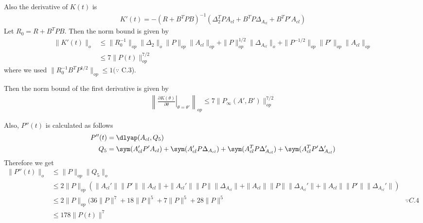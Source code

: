 Also the derivative of $K(t)$ is
\begin{align*}
    K'(t) = -(R + B^TPB)^{-1}\left(\Delta_2^TPA_{cl} + B^TP\Delta_{A_{cl}} + B^TP'A_{cl}\right)
\end{align*}
Let $R_0 = R + B^TPB$. 
Then the norm bound is given by
\begin{align*}
    \|K'(t)\|_o &\leq \|R_0^{-1}\|_{op}\|\Delta_2\|_{o}\|P\|_{op}\|A_{cl}\|_{op} + \|P\|^{1/2}_{op}\|\Delta_{A_{cl}}\|_{o} + \|P^{-1/2}\|_{op}\|P'\|_{op}\|A_{cl}\|_{op} \\
    &\leq 7\|P(t)\|^{7/2}_{op}
\end{align*}
where we used $\|R_0^{-1}B^TP^{1/2}\|_{op}\leq1 (\because$ C.3).

Then the norm bound of the first derivative is given by
\begin{align}
    \left\|\left.\frac{\partial K(\theta)}{\partial\theta}\right|_{\theta = \theta'}\right\|_{op} \leq 7\|P_{\infty}(A', B')\|_{op}^{7/2} \label{eq:dk/dtheta bound}
\end{align}

Also, $P''(t)$ is calculated as follows
\begin{align*}
    P''(t) &= \dlyap(A_{cl}, Q_5) \\
    Q_5 &= \sym(A_{cl}'P'A_{cl}) + \sym(A_{cl}'P\Delta_{A_{cl}}) + \sym(A_{cl}^TP\Delta_{A_{cl}}') + \sym(A_{cl}^TP'\Delta_{A_{cl}}')
\end{align*}
Therefore we get
\begin{align*}
    \|P''(t)\|_o &\leq \|P\|_{op}\|Q_5\|_o \\
    &\leq 2\|P\|_{op}(\|A_{cl}'\|\|P'\|\|A_{cl}\| + \|A_{cl}'\|\|P\|\|\Delta_{A_{cl}}\| + \|A_{cl}\|\|P\|\|\Delta_{A_{cl}}'\| + \|A_{cl}\|\|P'\|\|\Delta_{A_{cl}}'\|) \\
    &\leq 2\|P\|_{op}(36\|P\|^7 + 18\|P\|^5 + 7\|P\|^5 + 28\|P\|^5 &\because C.4 \\
    &\leq 178\|P(t)\|^7
\end{align*}

